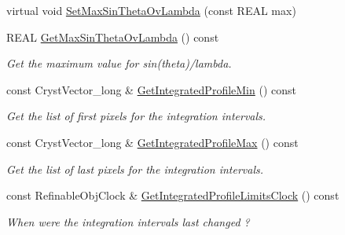 \begin{DoxyCompactItemize}
\item 
virtual void \mbox{\hyperlink{class_obj_cryst_1_1_powder_pattern_a465b2fc0d398e7090142694a7d2a8976}{Set\+Max\+Sin\+Theta\+Ov\+Lambda}} (const R\+E\+AL max)
\item 
\mbox{\label{class_obj_cryst_1_1_powder_pattern_abbac889b7cf0eb63fb7dd44b6ab314ce}} 
R\+E\+AL \mbox{\hyperlink{class_obj_cryst_1_1_powder_pattern_abbac889b7cf0eb63fb7dd44b6ab314ce}{Get\+Max\+Sin\+Theta\+Ov\+Lambda}} () const
\begin{DoxyCompactList}\small\item\em Get the maximum value for sin(theta)/lambda. \end{DoxyCompactList}\item 
\mbox{\label{class_obj_cryst_1_1_powder_pattern_a1de0c8b818319dc1570826538665879c}} 
const Cryst\+Vector\+\_\+long \& \mbox{\hyperlink{class_obj_cryst_1_1_powder_pattern_a1de0c8b818319dc1570826538665879c}{Get\+Integrated\+Profile\+Min}} () const
\begin{DoxyCompactList}\small\item\em Get the list of first pixels for the integration intervals. \end{DoxyCompactList}\item 
\mbox{\label{class_obj_cryst_1_1_powder_pattern_add507c79436f8087a1cea721ee602d84}} 
const Cryst\+Vector\+\_\+long \& \mbox{\hyperlink{class_obj_cryst_1_1_powder_pattern_add507c79436f8087a1cea721ee602d84}{Get\+Integrated\+Profile\+Max}} () const
\begin{DoxyCompactList}\small\item\em Get the list of last pixels for the integration intervals. \end{DoxyCompactList}\item 
\mbox{\label{class_obj_cryst_1_1_powder_pattern_a30eb704dc31b1cc0b6bc2d746c37997c}} 
const Refinable\+Obj\+Clock \& \mbox{\hyperlink{class_obj_cryst_1_1_powder_pattern_a30eb704dc31b1cc0b6bc2d746c37997c}{Get\+Integrated\+Profile\+Limits\+Clock}} () const
\begin{DoxyCompactList}\small\item\em When were the integration intervals last changed ? \end{DoxyCompactList}\item 

\end{DoxyCompactItemize}
